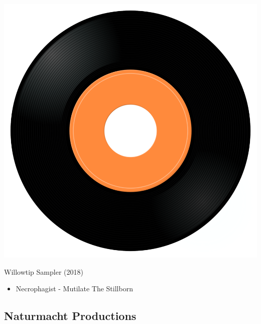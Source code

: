\begin{minipage}[t]{0.25\textwidth}\vspace{0pt}
\captionsetup{type=figure}
\includegraphics[width=\textwidth]{Images/cover.png}
\caption*{Willowtip Sampler (2018)}
\end{minipage}
\begin{minipage}[t]{0.25\textwidth}\vspace{0pt}
\begin{itemize}[nosep,leftmargin=1em,labelwidth=*,align=left]
	\setlength{\itemsep}{0pt}
	\item Necrophagist - Mutilate The Stillborn
\end{itemize}
\end{minipage}

\subsection{Naturmacht Productions}

